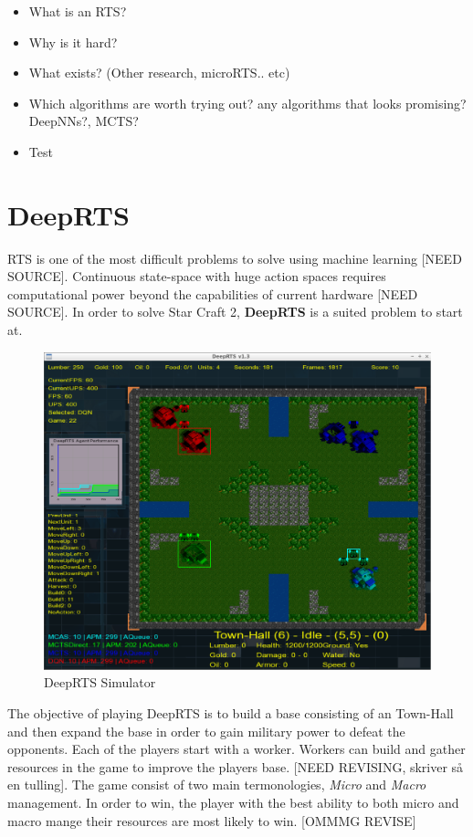 \documentclass[fleqn,10pt]{article} %
\begin{document}
\begin{itemize}
    \item What is an RTS?
    \item Why is it hard?
    \item What exists? (Other research, microRTS.. etc)
    \item Which algorithms are worth trying out? any algorithms that looks promising? DeepNNs?, MCTS?
    \item Test
\end{itemize}


\section{DeepRTS}
RTS is one of the most difficult problems to solve using machine learning [NEED SOURCE]. Continuous state-space with huge action spaces requires computational power beyond the capabilities of current hardware [NEED SOURCE]. In order to solve Star Craft 2, \textbf{DeepRTS} is a suited problem to start at.


\begin{figure}[ht]\centering
\includegraphics[width=\linewidth]{deep_rts}
\caption{DeepRTS Simulator}
\label{fig:results}
\end{figure}

The objective of playing DeepRTS is to build a base consisting of an Town-Hall and then expand the base in order to gain military power to defeat the opponents. Each of the players start with a worker. Workers can build and gather resources in the game to improve the players base.   [NEED REVISING, skriver så en tulling]. The game consist of two main termonologies, \textit{Micro} and \textit{Macro} management. In order to win, the player with the best ability to both micro and macro mange their resources are most likely to win. [OMMMG REVISE]
\end{document}
